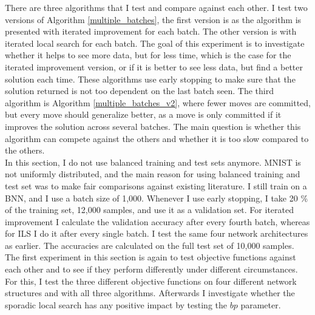 \noindent There are three algorithms that I test and compare against each other. I test two versions of Algorithm \ref{multiple_batches}, the first version is as the algorithm is presented with iterated improvement for each batch. The other version is with iterated local search for each batch. The goal of this experiment is to investigate whether it helps to see more data, but for less time, which is the case for the iterated improvement version, or if it is better to see less data, but find a better solution each time. These algorithms use early stopping to make sure that the solution returned is not too dependent on the last batch seen. The third algorithm is Algorithm \ref{multiple_batches_v2}, where fewer moves are committed, but every move should generalize better, as a move is only committed if it improves the solution across several batches. The main question is whether this algorithm can compete against the others and whether it is too slow compared to the others. \\

\noindent In this section, I do not use balanced training and test sets anymore. MNIST is not uniformly distributed, and the main reason for using balanced training and test set was to make fair comparisons against existing literature. I still train on a BNN, and I use a batch size of 1,000. Whenever I use early stopping, I take 20 \% of the training set, 12,000 samples, and use it as a validation set. For iterated improvement I calculate the validation accuracy after every fourth batch, whereas for ILS I do it after every single batch. I test the same four network architectures as earlier. The accuracies are calculated on the full test set of 10,000 samples. \\

\noindent The first experiment in this section is again to test objective functions against each other and to see if they perform differently under different circumstances. For this, I test the three different objective functions on four different network structures and with all three algorithms. Afterwards I investigate whether the sporadic local search has any positive impact by testing the $bp$ parameter. 

